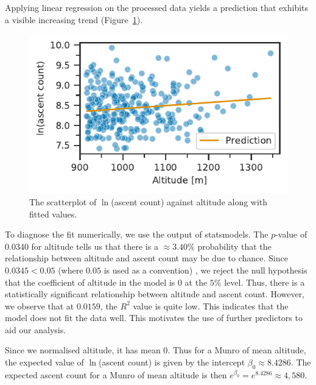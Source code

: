 \documentclass[11pt,a4paper]{article}
\begin{document}
Applying linear regression on the processed data yields a prediction that exhibits a visible increasing trend (Figure~\ref{fds-project-template:fig:q1_prediction}).
\begin{figure} [h!]
  \centering
  \includegraphics{report/q1_prediction.pdf}
  \caption{The scatterplot of $\ln$(ascent count) against altitude along with fitted values.}
  \label{fds-project-template:fig:q1_prediction}
\end{figure}

To diagnose the fit numerically, we use the output of statsmodels. The $p$-value of 0.0340 for altitude tells us that there is a $\approx 3.40\%$ probability that the relationship between altitude and ascent count may be due to chance. Since $0.0345 < 0.05$ (where $0.05$ is used as a convention) %
, we reject the null hypothesis that the coefficient of altitude in the model is 0 at the $5\%$ level. Thus, there is a statistically significant relationship between altitude and ascent count. However, we observe that at $0.0159$, the $R^{2}$ value is quite low. This indicates that the model does not fit the data well. This motivates the use of further predictors to aid our analysis.

Since we normalised altitude, it has mean 0. Thus for a Munro of mean altitude, the expected value of $\ln$(ascent count) is given by the intercept $\beta_0\approx8.4286$. The expected ascent count for a Munro of mean altitude is then $e^{\beta_0}=e^{8.4286}\approx 4,580$.
\end{document}
